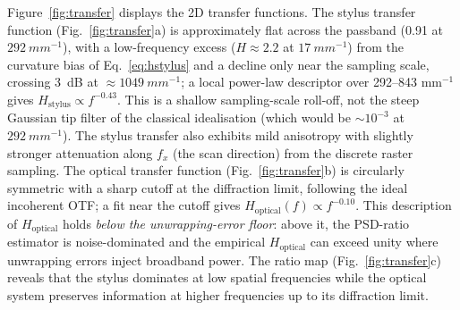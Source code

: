 \documentclass[review,12pt]{elsarticle}
\begin{document}
Figure~\ref{fig:transfer} displays the 2D transfer functions. The stylus transfer function (Fig.~\ref{fig:transfer}a) is approximately flat across the passband (0.91 at $\SI{292}{mm^{-1}}$), with a low-frequency excess ($H \approx 2.2$ at $\SI{17}{mm^{-1}}$) from the curvature bias of Eq.~\ref{eq:hstylus} and a decline only near the sampling scale, crossing \SI{3}{dB} at $\approx\SI{1049}{mm^{-1}}$; a local power-law descriptor over 292--843 mm$^{-1}$ gives $H_\mathrm{stylus} \propto f^{-0.43}$. This is a shallow sampling-scale roll-off, not the steep Gaussian tip filter of the classical idealisation (which would be $\sim10^{-3}$ at $\SI{292}{mm^{-1}}$). The stylus transfer also exhibits mild anisotropy with slightly stronger attenuation along $f_x$ (the scan direction) from the discrete raster sampling. The optical transfer function (Fig.~\ref{fig:transfer}b) is circularly symmetric with a sharp cutoff at the diffraction limit, following the ideal incoherent OTF; a fit near the cutoff gives $H_\mathrm{optical}(f) \propto f^{-0.10}$. This description of $H_\mathrm{optical}$ holds \emph{below the unwrapping-error floor}: above it, the PSD-ratio estimator is noise-dominated and the empirical $H_\mathrm{optical}$ can exceed unity where unwrapping errors inject broadband power. The ratio map (Fig.~\ref{fig:transfer}c) reveals that the stylus dominates at low spatial frequencies while the optical system preserves information at higher frequencies up to its diffraction limit.
\end{document}
